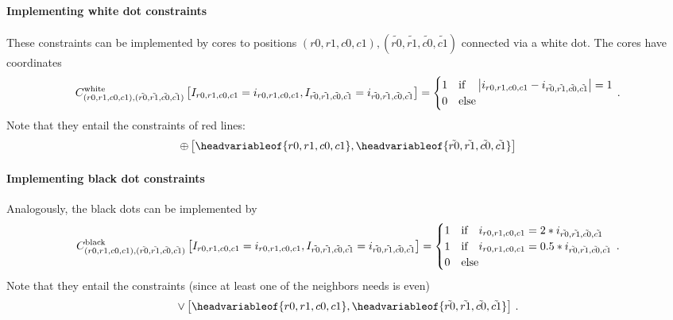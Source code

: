 \documentclass[aps,onecolumn,nofootinbib,pra]{article}
\begin{document}
    \paragraph{Implementing white dot constraints}
    These constraints can be implemented by cores to positions $(r0,r1,c0,c1),(\tilde{r0},\tilde{r1},\tilde{c0},\tilde{c1})$ connected via a white dot.
    The cores have coordinates
    \begin{align*}
        C^{\mathrm{white}}_{(r0,r1,c0,c1),(\tilde{r0},\tilde{r1},\tilde{c0},\tilde{c1})}\left[I_{r0,r1,c0,c1}=i_{r0,r1,c0,c1},I_{\tilde{r0},\tilde{r1},\tilde{c0},\tilde{c1}}=i_{\tilde{r0},\tilde{r1},\tilde{c0},\tilde{c1}}\right]
        =\begin{cases}
             1 & \text{if}\quad \left|i_{r0,r1,c0,c1}-i_{\tilde{r0},\tilde{r1},\tilde{c0},\tilde{c1}}\right| = 1 \\
             0 & \text{else}
        \end{cases} \, .
    \end{align*}
    Note that they entail the constraints of red lines:
    \begin{align*}
        \oplus\left[\headvariableof{r0,r1,c0,c1},\headvariableof{\tilde{r0},\tilde{r1},\tilde{c0},\tilde{c1}}\right]
    \end{align*}

    \paragraph{Implementing black dot constraints}
    Analogously, the black dots can be implemented by
    \begin{align*}
        C^{\mathrm{black}}_{(r0,r1,c0,c1),(\tilde{r0},\tilde{r1},\tilde{c0},\tilde{c1})}\left[I_{r0,r1,c0,c1}=i_{r0,r1,c0,c1},I_{\tilde{r0},\tilde{r1},\tilde{c0},\tilde{c1}}=i_{\tilde{r0},\tilde{r1},\tilde{c0},\tilde{c1}}\right]
        =\begin{cases}
             1 & \text{if}\quad i_{r0,r1,c0,c1}=2*i_{\tilde{r0},\tilde{r1},\tilde{c0},\tilde{c1}} \\
             1 & \text{if}\quad i_{r0,r1,c0,c1}=0.5*i_{\tilde{r0},\tilde{r1},\tilde{c0},\tilde{c1}} \\
             0 & \text{else}
        \end{cases} \, .
    \end{align*}
    Note that they entail the constraints (since at least one of the neighbors needs is even)
    \begin{align*}
        \lor\left[\headvariableof{r0,r1,c0,c1},\headvariableof{\tilde{r0},\tilde{r1},\tilde{c0},\tilde{c1}}\right] \, .
    \end{align*}
%
\end{document}
